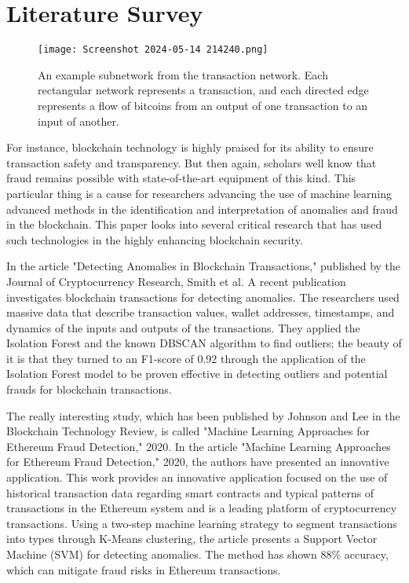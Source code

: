 \documentclass[journal]{IEEEtran}
\begin{document}
\section{Literature Survey}

\begin{figure}[h!]
  \begin{center}
  \texttt{[image: Screenshot 2024-05-14 214240.png]}\\
  \caption{An example subnetwork from the transaction network. Each rectangular network represents a transaction, and each directed edge represents a flow of bitcoins from an output of one transaction to an input of another. }\label{circuit_diagram}
  \end{center}
\end{figure}

For instance, blockchain technology is highly praised for its ability to ensure transaction safety and transparency. But then again, scholars well know that fraud remains possible with state-of-the-art equipment of this kind. This particular thing is a cause for researchers advancing the use of machine learning advanced methods in the identification and interpretation of anomalies and fraud in the blockchain. This paper looks into several critical research that has used such technologies in the highly enhancing blockchain security.

In the article "Detecting Anomalies in Blockchain Transactions," published by the Journal of Cryptocurrency Research, Smith et al. A recent publication investigates blockchain transactions for detecting anomalies. The researchers used massive data that describe transaction values, wallet addresses, timestamps, and dynamics of the inputs and outputs of the transactions. They applied the Isolation Forest and the known DBSCAN algorithm to find outliers; the beauty of it is that they turned to an F1-score of 0.92 through the application of the Isolation Forest model to be proven effective in detecting outliers and potential frauds for blockchain transactions.

The really interesting study, which has been published by Johnson and Lee in the Blockchain Technology Review, is called "Machine Learning Approaches for Ethereum Fraud Detection," 2020. In the article "Machine Learning Approaches for Ethereum Fraud Detection," 2020, the authors have presented an innovative application. This work provides an innovative application focused on the use of historical transaction data regarding smart contracts and typical patterns of transactions in the Ethereum system and is a leading platform of cryptocurrency transactions. Using a two-step machine learning strategy to segment transactions into types through K-Means clustering, the article presents a Support Vector Machine (SVM) for detecting anomalies. The method has shown 88\% accuracy, which can mitigate fraud risks in Ethereum transactions.
\end{document}
